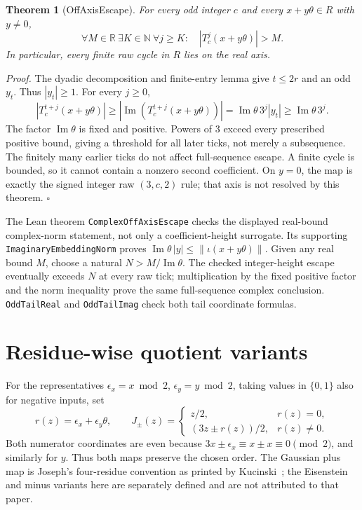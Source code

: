 \documentclass[11pt,letterpaper]{article}
\newcommand{\N}{\mathbb{N}}
\newcommand{\R}{\mathbb{R}}
\newtheorem{theorem}{Theorem}
\newenvironment{proof}{\noindent\textit{Proof.}}{\hfill\(\square\)}
\begin{document}
\begin{theorem}[OffAxisEscape]
For every odd integer \(c\) and every \(x+y\theta\in R\) with \(y\ne0\),
\[
\forall M\in\R\ \exists K\in\N\ \forall j\ge K:
\quad |T_c^j(x+y\theta)|>M.
\]
In particular, every finite raw cycle in \(R\) lies on the real axis.
\end{theorem}
\begin{proof}
The dyadic decomposition and finite-entry lemma give \(t\le2r\) and an odd \(y_t\). Thus \(|y_t|\ge1\). For every \(j\ge0\),
\[
|T_c^{t+j}(x+y\theta)|
\ge |\operatorname{Im}(T_c^{t+j}(x+y\theta))|
=\operatorname{Im}\theta\,3^j|y_t|
\ge\operatorname{Im}\theta\,3^j.
\]
The factor \(\operatorname{Im}\theta\) is fixed and positive. Powers of \(3\) exceed every prescribed positive bound, giving a threshold for all later ticks, not merely a subsequence. The finitely many earlier ticks do not affect full-sequence escape. A finite cycle is bounded, so it cannot contain a nonzero second coefficient. On \(y=0\), the map is exactly the signed integer raw \((3,c,2)\) rule; that axis is not resolved by this theorem.
\end{proof}

The Lean theorem \texttt{ComplexOffAxisEscape} checks the displayed real-bound complex-norm statement, not only a coefficient-height surrogate. Its supporting \texttt{ImaginaryEmbeddingNorm} proves \(\operatorname{Im}\theta\,|y|\le\|\iota(x+y\theta)\|\). Given any real bound \(M\), choose a natural \(N>M/\operatorname{Im}\theta\). The checked integer-height escape eventually exceeds \(N\) at every raw tick; multiplication by the fixed positive factor and the norm inequality prove the same full-sequence complex conclusion. \texttt{OddTailReal} and \texttt{OddTailImag} check both tail coordinate formulas.

\section{Residue-wise quotient variants}

For the representatives \(\epsilon_x=x\bmod2\), \(\epsilon_y=y\bmod2\), taking values in \(\{0,1\}\) also for negative inputs, set
\[
r(z)=\epsilon_x+\epsilon_y\theta,
\qquad
J_\pm(z)=\begin{cases}
z/2,&r(z)=0,\\(3z\pm r(z))/2,&r(z)\ne0.
\end{cases}
\]
Both numerator coordinates are even because \(3x\pm\epsilon_x\equiv x\pm x\equiv0\pmod2\), and similarly for \(y\). Thus both maps preserve the chosen order. The Gaussian plus map is Joseph's four-residue convention as printed by Kucinski~\cite{Kucinski00}; the Eisenstein and minus variants here are separately defined and are not attributed to that paper.
\end{document}

